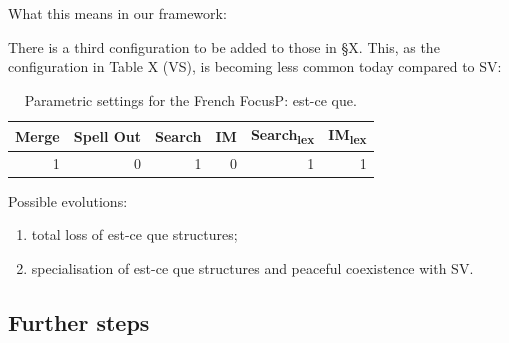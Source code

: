 \documentclass[fleqn,10pt]{wlscirep}
\begin{document}
\noindent What this means in our framework:

\noindent There is a third configuration to be added to those in §X. This, as the configuration in Table X (VS), is becoming less common today compared to SV:

\begin{table}[H]
    \centering
    \begin{tabular}{|r|r|r|r|r|r|}
    \hline
    Merge & Spell Out & Search & IM & Search\textsubscript{lex} & IM\textsubscript{lex} \\
    \hline
    1 & 0 & 1 & 0 & 1 & 1 \\
    \hline
    \end{tabular}
    \caption{\label{tab:samp}Parametric settings for the French FocusP: est-ce que.}
\end{table}

\noindent Possible evolutions:

\begin{enumerate}
    \item \vspace*{-2mm} total loss of est-ce que structures;
    \item \vspace*{-2mm} specialisation of est-ce que structures and peaceful coexistence with SV.
\end{enumerate}

\subsection*{Further steps}
\end{document}
